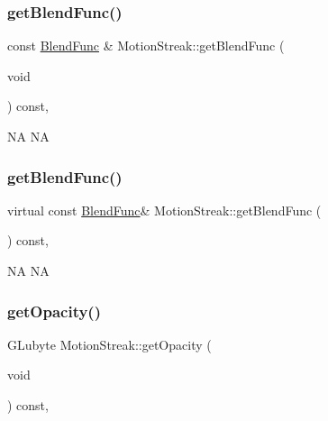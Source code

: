 \subsubsection{\texorpdfstring{get\+Blend\+Func()}{getBlendFunc()}\hspace{0.1cm}{\footnotesize\ttfamily [1/2]}}
{\footnotesize\ttfamily const \hyperlink{structBlendFunc}{Blend\+Func} \& Motion\+Streak\+::get\+Blend\+Func (\begin{DoxyParamCaption}\item[{void}]{ }\end{DoxyParamCaption}) const\hspace{0.3cm}{\ttfamily [override]}, {\ttfamily [virtual]}}

NA  NA \mbox{\label{classMotionStreak_a3a0c0b09fffc1d33efaf197f22e6e590}} 
\subsubsection{\texorpdfstring{get\+Blend\+Func()}{getBlendFunc()}\hspace{0.1cm}{\footnotesize\ttfamily [2/2]}}
{\footnotesize\ttfamily virtual const \hyperlink{structBlendFunc}{Blend\+Func}\& Motion\+Streak\+::get\+Blend\+Func (\begin{DoxyParamCaption}{ }\end{DoxyParamCaption}) const\hspace{0.3cm}{\ttfamily [override]}, {\ttfamily [virtual]}}

NA  NA \mbox{\label{classMotionStreak_a433b068de6c2246676c0654480cb9ea2}} 
\subsubsection{\texorpdfstring{get\+Opacity()}{getOpacity()}\hspace{0.1cm}{\footnotesize\ttfamily [1/2]}}
{\footnotesize\ttfamily G\+Lubyte Motion\+Streak\+::get\+Opacity (\begin{DoxyParamCaption}\item[{void}]{ }\end{DoxyParamCaption}) const\hspace{0.3cm}{\ttfamily [override]}, {\ttfamily [virtual]}}

